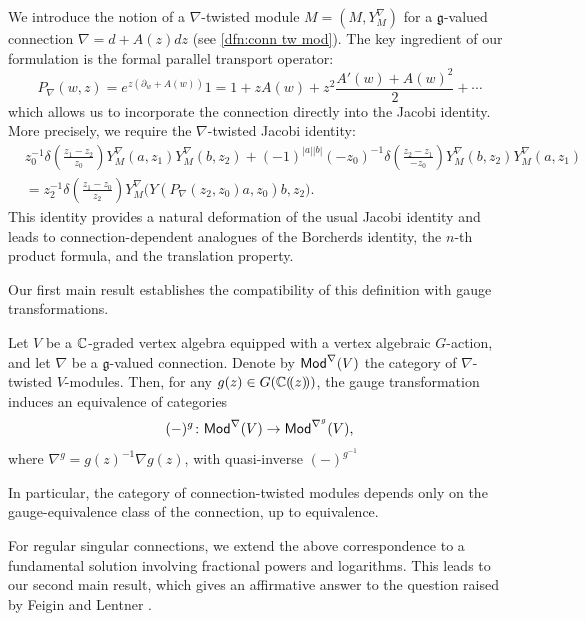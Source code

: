 \documentclass[final,reqno]{amsart}
\begin{document}
We introduce the notion of a $\nabla$-twisted module $M=(M,Y_M^\nabla)$ for a $\mathfrak g$-valued connection $\nabla=d+A(z)dz$ (see \cref{dfn:conn tw mod}). The key ingredient of our formulation is the formal parallel transport operator:
\[
    P_\nabla(w,z)=e^{z(\partial_w+A(w))}1=1+zA(w)+z^2\frac{A'(w)+A(w)^2}{2}+\cdots
\]
which allows us to incorporate the connection directly into the Jacobi identity. More precisely, we require the $\nabla$-twisted Jacobi identity:
\[
\begin{split}
&z_0^{-1}\delta\left(\frac{z_1-z_2}{z_0}\right)
Y_M^\nabla(a,z_1)Y_M^\nabla(b,z_2)+(-1)^{|a||b|}(-z_0)^{-1}
\delta\left(\frac{z_2-z_1}{-z_0}\right)
Y_M^\nabla(b,z_2)Y_M^\nabla(a,z_1)\\
&=z_2^{-1}\delta\left(\frac{z_1-z_0}{z_2}\right)
Y_M^\nabla\bigl(Y(P_\nabla(z_2,z_0)a,z_0)b,z_2\bigr).
\end{split}
\]
This identity provides a natural deformation of the usual Jacobi identity and leads to connection-dependent analogues of the Borcherds identity, the $n$-th product formula, and the translation property.

Our first main result establishes the compatibility of this definition with gauge transformations.
\begin{mainthm}
    Let $V$ be a $\mathbb{C}$-graded vertex algebra equipped with a vertex algebraic $G$-action, and let $\nabla$ be a $\mathfrak g$-valued connection. Denote by $\mathsf{Mod}^\nabla(V)$ the category of $\nabla$-twisted $V$-modules. Then, for any $g(z)\in G(\mathbb{C}(\!( z )\!))$, the gauge transformation induces an equivalence of categories
    \[
        (-)^g\colon\mathsf{Mod}^\nabla(V)\to\mathsf{Mod}^{\nabla^g}(V),
    \]
    where $\nabla^g=g(z)^{-1}\nabla g(z)$, with quasi-inverse $(-)^{g^{-1}}$
\end{mainthm} 
In particular, the category of connection-twisted modules depends only on the gauge-equivalence class of the connection, up to equivalence.

For regular singular connections, we extend the above correspondence to a fundamental solution involving fractional powers and logarithms. This leads to our second main result, which gives an affirmative answer to the question raised by Feigin and Lentner \cite{FL25,FL26}.
\end{document}
